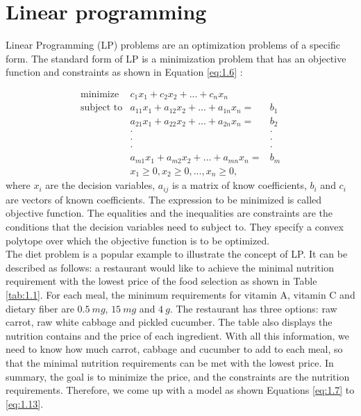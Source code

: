 \section{Linear programming}
Linear Programming (LP) problems are an optimization problems of a specific form. The standard form of LP is a minimization problem that has an objective function and constraints as shown in Equation \ref{eq:1.6} \cite{UULP}:

\begin{eqnarray}  \label{eq:1.6}
 \text{minimize} & c_{1}x_{1} + c_{2}x_{2} + ... + c_{n} x_{n}  \nonumber \\
 \text{subject to} & a_{11} x_{1} + a_{12} x_{2}+ ... + a_{1n} x_{n} = & b_{1} \nonumber \\
& a_{21} x_{1} + a_{22} x_{2} + ... + a_{2n} x_{n} = & b_{2} \nonumber \\
&\cdot                                    &\cdot \nonumber \\
&\cdot                                    &\cdot \nonumber \\
&\cdot                                    &\cdot \nonumber \\
& a_{m1} x_{1} + a_{m2} x_{2} + ... + a_{mn} x_{n} = & b_{m} \nonumber \\
& x_{1} \geq 0, x_{2} \geq 0, ... ,x_{n} \geq 0, 
\end{eqnarray} 
where $x_{i}$ are the decision variables, $a_{ij}$ is a matrix of know coefficients,  $b_{i}$ and $c_{i}$ are vectors of known coefficients. The expression to be minimized is called objective function. The equalities and the inequalities are constraints are the conditions that the decision variables need to subject to. They specify a convex polytope over which the objective function is to be optimized. \\

The diet problem is a popular example to illustrate the concept of LP. It can be described as follows: a restaurant would like to achieve the minimal nutrition requirement with the lowest price of the food selection as shown in Table \ref{tab:1.1}. For each meal, the minimum requirements for vitamin A, vitamin C and dietary fiber are $0.5~mg$, $15~mg$ and $4~g$. The restaurant has three options: raw carrot, raw white cabbage and pickled cucumber. The table also displays the nutrition contains and the price of each ingredient. With all this information, we need to know how much carrot, cabbage and cucumber to add to each meal, so that the minimal nutrition requirements can be met with the lowest price. In summary, the goal is to minimize the price, and the constraints are the nutrition requirements. Therefore, we come up with a model as shown Equations \ref{eq:1.7} to \ref{eq:1.13}.

